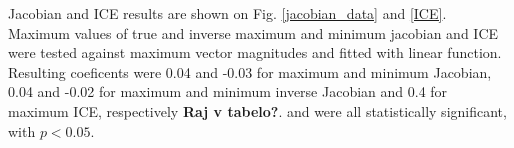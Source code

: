 \documentclass[type=dr, dr=rernat, accentcolor=tud7b,colorbacktitle, bigchapter, openright, twoside, 12pt ]{tudthesis}
\begin{document}
Jacobian and ICE results are shown on Fig. \ref{jacobian_data} and \ref{ICE}. Maximum values of true and inverse maximum and minimum jacobian and ICE were tested against maximum vector magnitudes and fitted with linear function. Resulting coeficents were 0.04 and -0.03 for maximum and minimum Jacobian, 0.04 and -0.02 for maximum and minimum inverse Jacobian and 0.4 for maximum ICE, respectively \textbf{Raj v tabelo?}. and were all statistically significant, with $p < 0.05$. 




\newpage
\end{document}
